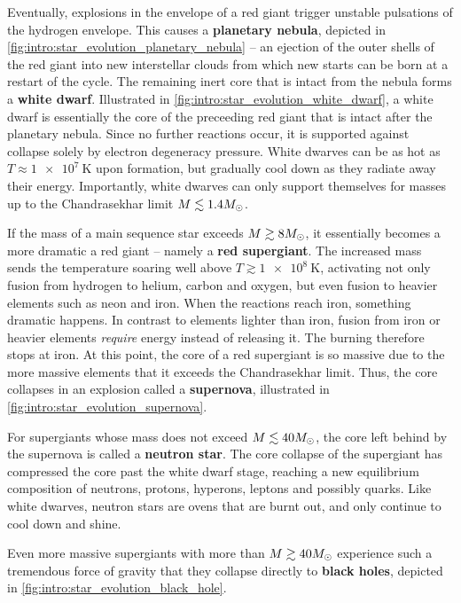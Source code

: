 Eventually, explosions in the envelope of a red giant trigger unstable pulsations of the hydrogen envelope.
This causes a \textbf{planetary nebula}, depicted in \cref{fig:intro:star_evolution_planetary_nebula} -- an ejection of the outer shells of the red giant into new interstellar clouds from which new starts can be born at a restart of the cycle.
The remaining inert core that is intact from the nebula forms a \textbf{white dwarf}.
Illustrated in \cref{fig:intro:star_evolution_white_dwarf}, a white dwarf is essentially the core of the preceeding red giant that is intact after the planetary nebula.
Since no further reactions occur, it is supported against collapse solely by electron degeneracy pressure.
White dwarves can be as hot as $T \approx \SI{1e7}{\kelvin}$ upon formation, but gradually cool down as they radiate away their energy.
Importantly, white dwarves can only support themselves for masses up to the Chandrasekhar limit $M \lesssim 1.4 M_\odot$.

If the mass of a main sequence star exceeds $M \gtrsim 8 M_\odot$, it essentially becomes a more dramatic a red giant -- namely a \textbf{red supergiant}.
The increased mass sends the temperature soaring well above $T \gtrsim \SI{1e8}{\kelvin}$, activating not only fusion from hydrogen to helium, carbon and oxygen, but even fusion to heavier elements such as neon and iron.
When the reactions reach iron, something dramatic happens.
In contrast to elements lighter than iron, fusion from iron or heavier elements \emph{require} energy instead of releasing it.
The burning therefore stops at iron.
At this point, the core of a red supergiant is so massive due to the more massive elements that it exceeds the Chandrasekhar limit.
Thus, the core collapses in an explosion called a \textbf{supernova}, illustrated in \cref{fig:intro:star_evolution_supernova}.

For supergiants whose mass does not exceed $M \lesssim 40 M_\odot$, the core left behind by the supernova is called a \textbf{neutron star}.
The core collapse of the supergiant has compressed the core past the white dwarf stage, reaching a new equilibrium composition of neutrons, protons, hyperons, leptons and possibly quarks.
Like white dwarves, neutron stars are ovens that are burnt out, and only continue to cool down and shine.

Even more massive supergiants with more than $M \gtrsim 40 M_\odot$ experience such a tremendous force of gravity that they collapse directly to \textbf{black holes}, depicted in \cref{fig:intro:star_evolution_black_hole}.

